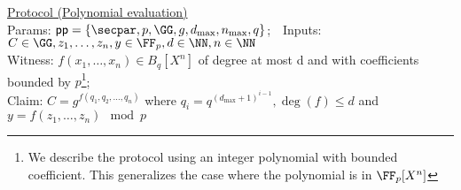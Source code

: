 \documentclass{article}
\begin{document}
\begin{small}
 \begin{minipage}{1.1\textwidth}
\begin{mdframed}[userdefinedwidth=1\textwidth]  \label{prot:Opening}
	\noindent \underline{\textsf{Protocol \eval} (Polynomial evaluation)}\\
\noindent Params: $\crs=\{\secpar,p,\GG,g,d_{\max},n_{\max},q\}$;\ \
Inputs: $C\in \GG,z_1,\dots,z_n,y\in \FF_p,d \in \NN,n \in \NN $\\
Witness: $f(x_1,\dots,x_n) \in B_q[X^n]$ of degree at most d and with coefficients bounded by $p$\footnote{We describe the protocol using an integer polynomial with bounded coefficient. This generalizes the case where the polynomial is in $\FF_p[X^n]$};\\ 
Claim: $C=g^{f(q_1,q_2,\dots,q_n)}$ where $q_i=q^{(d_{\max}+1)^{i-1} },\deg(f)\leq d$ and $y=f(z_1,\dots,z_n) \mod p$


\end{mdframed}
\end{minipage}
\end{small}
\end{document}
